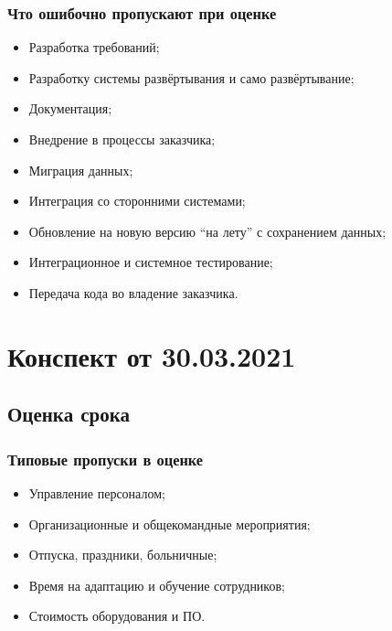 \documentclass[a4paper,8pt]{article}
\begin{document}
    \subsubsection{Что ошибочно пропускают при оценке}


     
        \begin{itemize}
            \item Разработка требований;
            \item Разработку системы развёртывания и само развёртывание;
            \item Документация;
            \item Внедрение в процессы заказчика;
            \item Миграция данных;
            \item Интеграция со сторонними системами;
            \item Обновление на новую версию ``на лету'' с сохранением данных;
            \item Интеграционное и системное тестирование;
            \item Передача кода во владение заказчика.

        \end{itemize}





\newpage
\section{Конспект от 30.03.2021}

\subsection{Оценка срока}

\subsubsection{Типовые пропуски в оценке}


    \begin{itemize}
        \item Управление персоналом;
        \item Организационные и общекомандные мероприятия;
        \item Отпуска, праздники, больничные;
        \item Время на адаптацию и обучение сотрудников;
        \item Стоимость оборудования и ПО.
    \end{itemize}
\end{document}
